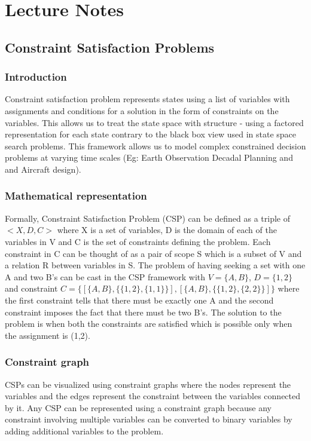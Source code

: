 \chapter{Lecture Notes}

\section{Constraint Satisfaction Problems}
\subsection{Introduction}
Constraint satisfaction problem represents states using a list of variables with assignments and conditions for a solution in the form of constraints on the variables. This allows us to treat the state space with structure - using a factored representation for each state contrary to the black box view used in state space search problems. This framework allows us to model complex constrained decision problems at varying time scales (Eg: Earth Observation Decadal Planning and and Aircraft design).

\subsection{Mathematical representation}
Formally, Constraint Satisfaction Problem (CSP) can be defined as a triple of $<X,D,C>$ where X is a set of variables, D is the domain of each of the variables in V and C is the set of constraints defining the problem. Each constraint in C can be thought of as a pair of scope S which is a subset of V and a relation R between variables in S. The problem of having seeking a set with one A and two B's can be cast in the CSP framework with $V = \{A,B\}$, $D = \{1,2\}$ and constraint $C = \{[\{A,B\},\{\{1,2\},\{1,1\}\}],[\{A,B\},\{\{1,2\},\{2,2\}\}]\}$ where the first constraint tells that there must be exactly one A and the second constraint imposes the fact that there must be two B's. The solution to the problem is when both the constraints are satisfied which is possible only when the assignment is (1,2).

\subsection{Constraint graph}
CSPs can be visualized using constraint graphs where the nodes represent the variables and the edges represent the constraint between the variables connected by it. Any CSP can be represented using a constraint graph  because any constraint involving multiple variables can be converted to binary variables by adding additional variables to the problem.\\


